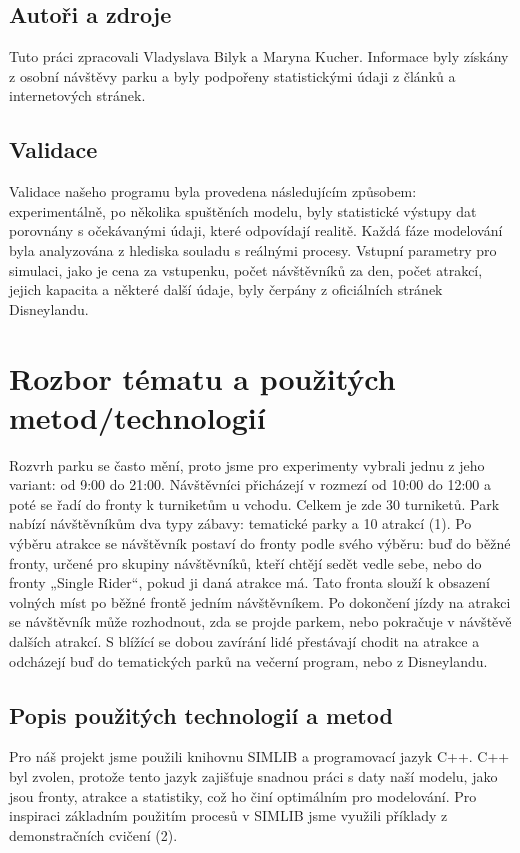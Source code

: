 \documentclass[a4paper,12pt]{article}
\begin{document}
\subsection{Autoři a zdroje}
Tuto práci zpracovali Vladyslava Bilyk a Maryna Kucher. Informace byly získány z osobní návštěvy parku a byly podpořeny statistickými údaji z článků a internetových stránek.

\subsection{Validace}
Validace našeho programu byla provedena následujícím způsobem: experimentálně, po několika spuštěních modelu, byly statistické výstupy dat porovnány s očekávanými údaji, které odpovídají realitě. Každá fáze modelování byla analyzována z hlediska souladu s reálnými procesy. Vstupní parametry pro simulaci, jako je cena za vstupenku, počet návštěvníků za den, počet atrakcí, jejich kapacita a některé další údaje, byly čerpány z oficiálních stránek Disneylandu.

\section{Rozbor tématu a použitých metod/technologií}
Rozvrh parku se často mění, proto jsme pro experimenty vybrali jednu z jeho variant: od 9:00 do 21:00. Návštěvníci přicházejí v rozmezí od 10:00 do 12:00 a poté se řadí do fronty k turniketům u vchodu. Celkem je zde 30 turniketů. Park nabízí návštěvníkům dva typy zábavy: tematické parky a 10 atrakcí (1). Po výběru atrakce se návštěvník postaví do fronty podle svého výběru: buď do běžné fronty, určené pro skupiny návštěvníků, kteří chtějí sedět vedle sebe, nebo do fronty „Single Rider“, pokud ji daná atrakce má. Tato fronta slouží k obsazení volných míst po běžné frontě jedním návštěvníkem. Po dokončení jízdy na atrakci se návštěvník může rozhodnout, zda se projde parkem, nebo pokračuje v návštěvě dalších atrakcí. S blížící se dobou zavírání lidé přestávají chodit na atrakce a odcházejí buď do tematických parků na večerní program, nebo z Disneylandu.
\subsection{Popis použitých technologií a metod}
Pro náš projekt jsme použili knihovnu SIMLIB a programovací jazyk C++. C++ byl zvolen, protože tento jazyk zajišťuje snadnou práci s daty naší modelu, jako jsou fronty, atrakce a statistiky, což ho činí optimálním pro modelování. Pro inspiraci základním použitím procesů v SIMLIB jsme využili příklady z demonstračních cvičení (2).
\end{document}

